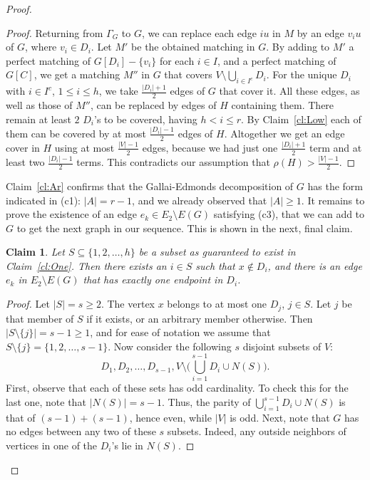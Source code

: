 \documentclass[10pt,a4paper]{amsart}
\newtheorem{claim}[theorem]{Claim}
\begin{document}
\begin{proof}
\begin{proof}
Returning from $\Gamma_G$ to $G$, we can replace each edge $iu$ in $M$ by an edge $v_iu$ of $G$, where $v_i \in D_i$. Let $M'$ be the obtained matching in $G$. By adding to $M'$ a perfect matching of $G[D_i] - \{v_i\}$ for each $i \in I$, and a perfect matching of $G[C]$, we get a matching $M''$ in $G$ that covers $V \setminus \bigcup_{i \in I^c} D_i$. For the unique $D_i$ with $i \in I^c$, $1 \le i \le h$, we take $\frac{|D_i|+1}{2}$ edges of $G$ that cover it. All these edges, as well as those of $M''$, can be replaced by edges of $H$ containing them. There remain at least $2$ $D_i$'s to be covered, having $h < i \le r$. By Claim~\ref{cl:Low} each of them can be covered by at most $\frac{|D_i|-1}{2}$ edges of $H$. Altogether we get an edge cover in $H$ using at most $\frac{|V|-1}{2}$ edges, because we had just one $\frac{|D_i|+1}{2}$ term and at least two $\frac{|D_i|-1}{2}$ terms. This contradicts our assumption that $\rho(H) > \frac{|V|-1}{2}$.
\end{proof}
Claim~\ref{cl:Ar} confirms that the Gallai-Edmonds decomposition of $G$ has the form indicated in (c1): $|A| = r - 1$, and we already observed that $|A| \ge 1$. It remains to prove the existence of an edge $e_k \in E_2 \setminus E(G)$ satisfying (c3), that we can add to $G$ to get the next graph in our sequence. This is shown in the next, final claim.
\begin{claim} \label{cl:Ek}
Let $S \subseteq \{1,2, \ldots , h\}$ be a subset as guaranteed to exist in Claim~\ref{cl:One}. Then there exists an $i \in S$ such that $x \notin D_i$, and there is an edge $e_k$ in $E_2 \setminus E(G)$ that has exactly one endpoint in $D_i$.
\end{claim}
\begin{proof}
Let $|S| = s \ge 2$. The vertex $x$ belongs to at most one $D_j$, $j \in S$. Let $j$ be that member of $S$ if it exists, or an arbitrary member otherwise. Then $|S \setminus \{j\}| = s-1 \ge 1$, and for ease of notation we assume that $S \setminus \{j\} = \{1,2, \ldots , s-1\}$. Now consider the following $s$ disjoint subsets of $V$: \[ D_1, D_2, \ldots , D_{s-1}, V \setminus \bigl( \bigcup _{i=1}^{s-1} D_i \cup N(S) \bigr).\] First, observe that each of these sets has odd cardinality. To check this for the last one, note that $|N(S)| = s-1$. Thus, the parity of $\bigcup _{i=1}^{s-1} D_i \cup N(S)$ is that of $(s-1) + (s-1)$, hence even, while $|V|$ is odd. Next, note that $G$ has no edges between any two of these $s$ subsets. Indeed, any outside neighbors of vertices in one of the $D_i$'s lie in $N(S)$.


\end{proof}
\end{proof}
\end{document}
